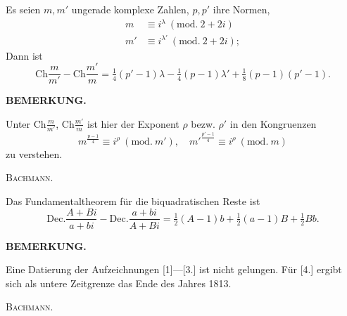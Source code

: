 Es seien $m,m'$ ungerade komplexe Zahlen,\newline
\hspace*{6em}$p,p'$ ihre Normen,
\[
\begin{aligned}
m&\equiv i^\lambda\ (\mathrm{mod.}\ 2+2i)\\
m'&\equiv i^{\lambda'}\ (\mathrm{mod.}\ 2+2i);
\end{aligned}
\]
\noindent Dann ist
\[
\mathrm{Ch}\frac m{m'}-\mathrm{Ch}\frac{m'}m=\tfrac14(p'-1)\lambda-\tfrac14(p-1)\lambda'+\tfrac18(p-1)(p'-1).
\]
\begin{center}\textbf{BEMERKUNG.}\end{center}
\begingroup\small
\par\indent Unter $\mathrm{Ch}\frac m{m'}$, $\mathrm{Ch}\frac{m'}m$ ist hier der Exponent $\rho$ bezw. $\rho'$ in den Kongruenzen
\[
m^{\frac{p-1}{4}}\equiv i^\rho\ (\mathrm{mod.}\ m'),\quad m'^{\frac{p'-1}{4}}\equiv i^\rho\ (\mathrm{mod.}\ m)
\]
\noindent zu verstehen.
\begin{flushright}\textsc{Bachmann.}\end{flushright}
\clearpage\endgroup

\par\indent Das Fundamentaltheorem für die biquadratischen Reste ist
\[
\mathrm{Dec.}\frac{A+Bi}{a+bi}-\mathrm{Dec.}\frac{a+bi}{A+Bi}=\tfrac12(A-1)b+\tfrac12(a-1)B+\tfrac12Bb.
\]
\begin{center}\textbf{BEMERKUNG.}\end{center}
\begingroup\small
\par\indent Eine Datierung der Aufzeichnungen [1]—[3.] ist nicht gelungen. Für [4.] ergibt sich als untere Zeitgrenze das Ende des Jahres 1813.
\begin{flushright}\textsc{Bachmann.}\end{flushright}
\ClosingRule\clearpage\endgroup
